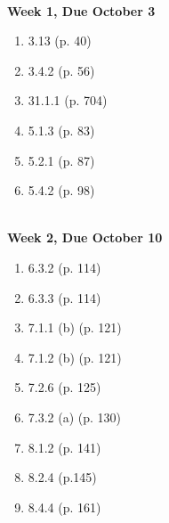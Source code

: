 \documentclass[12pt, twocolumn]{article}
\begin{document}






\normalsize 



\begin{minipage}[t]{0.5\textwidth}

\ \\ \textbf{Week 1, Due October 3} 

\begin{enumerate} 
\item 3.13 (p. 40)
\item 3.4.2 (p. 56)
\item 31.1.1 (p. 704)
\item 5.1.3 (p. 83)
\item 5.2.1 (p. 87)
\item 5.4.2 (p. 98)
\end{enumerate}



\ \\ \textbf{Week 2, Due October 10} 
\begin{enumerate} 
\item 6.3.2 (p. 114)
\item 6.3.3 (p. 114)
\item 7.1.1 (b) (p. 121)
\item 7.1.2 (b) (p. 121)
\item 7.2.6 (p. 125)
\item 7.3.2 (a) (p. 130)
\item 8.1.2 (p. 141)
\item 8.2.4 (p.145)
\item 8.4.4 (p. 161)

\end{enumerate}

\end{minipage}
\end{document}
